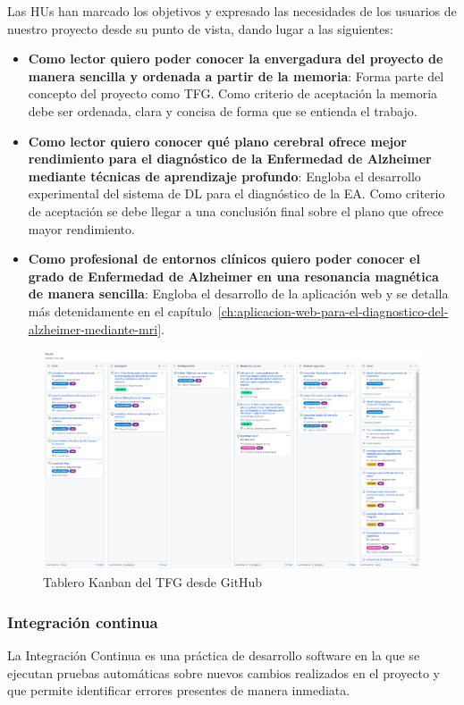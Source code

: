 Las HUs  han marcado los objetivos y expresado las necesidades de los usuarios de nuestro proyecto desde su punto de
vista, dando lugar a las siguientes:
\begin{itemize}
    \item \textbf{Como lector quiero poder conocer la envergadura del proyecto de manera sencilla y ordenada a partir de la
    memoria}: Forma parte del concepto del proyecto como TFG. Como criterio de aceptación la memoria debe ser ordenada,
    clara y concisa de forma que se entienda el trabajo.
    \item \textbf{Como lector quiero conocer qué plano cerebral ofrece mejor rendimiento para el diagnóstico de la Enfermedad de
    Alzheimer mediante técnicas de aprendizaje profundo}: Engloba el desarrollo experimental del sistema de DL para el
    diagnóstico de la EA. Como criterio de aceptación  se debe llegar a una conclusión final sobre el plano que ofrece
    mayor rendimiento.
    \item \textbf{Como profesional de entornos clínicos quiero poder conocer el grado de Enfermedad de Alzheimer en una
    resonancia magnética de manera sencilla}:  Engloba el desarrollo de la aplicación web y se detalla más detenidamente
    en el capítulo~\ref{ch:aplicacion-web-para-el-diagnostico-del-alzheimer-mediante-mri}. \\
\end{itemize}

\begin{figure}[H]
    \centering
    \includegraphics[width=\textwidth]{./imgs/tablero-github}
    \caption{Tablero Kanban del TFG desde GitHub}
    \label{fig:tablero-kanban-github}
\end{figure}

\subsubsection{Integración continua}
La Integración Continua es una práctica de desarrollo software en la que se ejecutan pruebas automáticas sobre nuevos
cambios realizados en el proyecto y que permite identificar errores presentes de manera inmediata.

